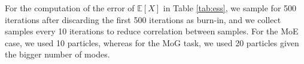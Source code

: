 \begin{table}[H]
\caption{Effective sample size results for the two synthetic distributions task}\label{tab:ess}
\end{table}

\begin{table}[H]
\caption{Error results for the two synthetic distributions task}\label{tab:ess2}
\end{table}

For the computation of the error of $\mathbb{E}\left[ X \right]$ in Table \ref{tab:ess}, we sample for 500 iterations after discarding the first 500 iterations as burn-in, and we collect samples every 10 iterations to reduce correlation between samples. For the MoE case, we used 10 particles, whereas for the MoG task, we used 20 particles given the bigger number of modes.

